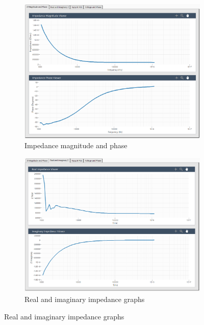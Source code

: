 \begin{figure}[h]
    \centering
    \begin{subfigure}[b]{0.48\textwidth}
        \centering
        \includegraphics[width=\textwidth]{images/labview_mag_phase_graph.png}
        \caption{Impedance magnitude and phase}
        \label{fig:labview_mag-phase_graph}
    \end{subfigure}
    \hfill
    \begin{subfigure}[b]{0.48\textwidth}
        \centering
        \includegraphics[width=\textwidth]{images/labview_real_imag_graph.png}
        \caption{Real and imaginary impedance graphs}
        \label{fig:labview_real-imag_graph}
    \end{subfigure}

\end{figure}
